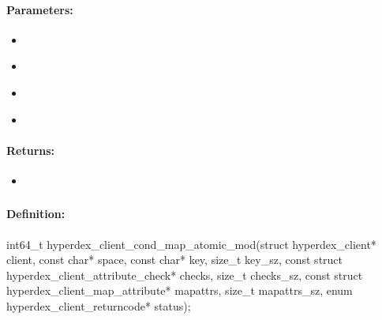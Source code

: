 \paragraph{Parameters:}
\begin{itemize}[noitemsep]
\item {}\\

\item {}\\

\item {}\\

\item {}\\

\end{itemize}

\paragraph{Returns:}
\begin{itemize}[noitemsep]
\item {}\\

\end{itemize}

\pagebreak
\subsubsection{}
\label{api:c:cond_map_atomic_mod}


\paragraph{Definition:}
\begin{ccode}
int64_t hyperdex_client_cond_map_atomic_mod(struct hyperdex_client* client,
        const char* space,
        const char* key, size_t key_sz,
        const struct hyperdex_client_attribute_check* checks, size_t checks_sz,
        const struct hyperdex_client_map_attribute* mapattrs, size_t mapattrs_sz,
        enum hyperdex_client_returncode* status);
\end{ccode}


